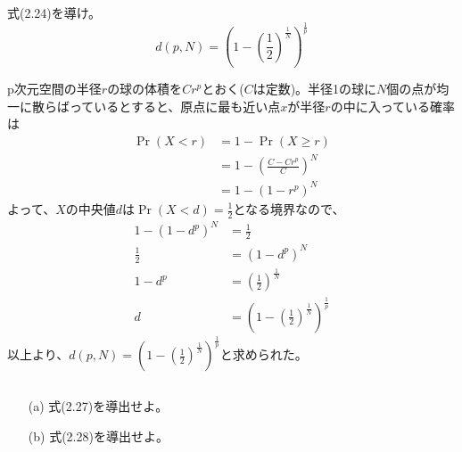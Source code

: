 \documentclass{jsarticle}
\begin{document}
\subsection{}

\begin{shadebox}
式(2.24)を導け。
\[d(p,N)=(1-(\frac{1}{2})^{\frac{1}{N}})^{\frac{1}{p}}\]
\end{shadebox}
p次元空間の半径$r$の球の体積を$Cr^p$とおく($C$は定数)。半径1の球に$N$個の点が均一に散らばっているとすると、原点に最も近い点$x$が半径$r$の中に入っている確率は
\begin{align*}
\Pr(X<r)&=1-\Pr(X\geq r)\\
&=1-(\frac{C-Cr^p}{C})^N\\
&=1-(1-r^p)^N
\end{align*}
よって、$X$の中央値$d$は$\Pr(X<d)=\frac{1}{2}$となる境界なので、
\begin{align*}
1-(1-d^p)^N&=\frac{1}{2}\\
\frac{1}{2}&=(1-d^p)^N\\
1-d^p&=(\frac{1}{2})^\frac{1}{N}\\
d&=(1-(\frac{1}{2})^\frac{1}{N})^\frac{1}{p}
\end{align*}
以上より、$d(p,N)=(1-(\frac{1}{2})^\frac{1}{N})^\frac{1}{p}$と求められた。


\subsection{}

\subsection{}
\begin{shadebox}
\begin{enumerate}
\item[(a)]
式(2.27)を導出せよ。
\item[(b)]
式(2.28)を導出せよ。
\end{enumerate}
\end{shadebox}
\end{document}
